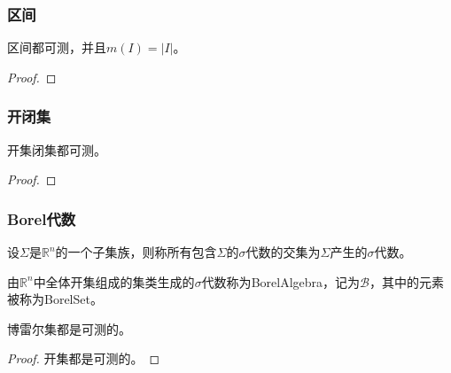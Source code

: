 \subsubsection{区间}
\begin{theorem}
	区间都可测，并且$m(I)=|I|$。
\end{theorem}
\begin{proof}
	
\end{proof}
\subsubsection{开闭集}
\begin{theorem}
	开集闭集都可测。
\end{theorem}
\begin{proof}
	
\end{proof}
\subsubsection{Borel代数}
\begin{definition}
	设$\Sigma$是$\mathbb{R}^n$的一个子集族，则称所有包含$\Sigma$的$\sigma$代数的交集为$\Sigma$产生的$\sigma$代数。
\end{definition}
\begin{definition}
	由$\mathbb{R}^n$中全体开集组成的集类生成的$\sigma$代数称为\gls{BorelAlgebra}，记为$\mathscr{B}$，其中的元素被称为\gls{BorelSet}。
\end{definition}
\begin{theorem}
	博雷尔集都是可测的。
\end{theorem}
\begin{proof}
	开集都是可测的。
\end{proof}
